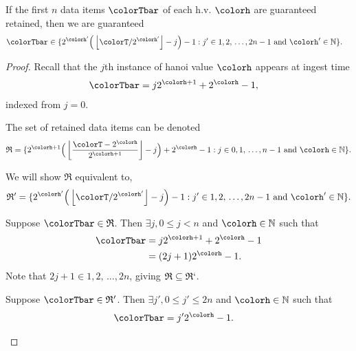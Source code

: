 \begin{lemma}
\label{thm:retained-equivalence-tilted}
If the first $n$ data items $\colorTbar$ of each h.v. $\colorh$ are guaranteed retained, then we are guaranteed
\begin{align*}
\colorTbar
&\in
\{
  2^{\colorh'}\Big(\left\lfloor \colorT / 2^{\colorh'} \right\rfloor - j\Big) - 1
  :
  j' \in 1,2,\,\ldots,2n-1
  \text{ and }
  \colorh' \in \mathbb{N}
\}.
\end{align*}
\end{lemma}
\begin{proof}

Recall that the $j$th instance of hanoi value $\colorh$ appears at ingest time
\begin{align*}
\colorTbar
&= j2^{\colorh + 1} + 2^{\colorh} - 1,
\end{align*}
indexed from $j=0$.

The set of retained data items can be denoted
\begin{align*}
\mathfrak{R} =
\{
  2^{\colorh + 1}\Big( \left\lfloor\frac{\colorT - 2^{\colorh}}{2^{\colorh + 1}} \right\rfloor - j\Big) + 2^{\colorh} - 1
  :
  j \in 0,1,\,\ldots,n-1
  \text{ and }
  \colorh \in \mathbb{N}
\}.
\end{align*}

We will show $\mathfrak{R}$ equivalent to,
\begin{align*}
\mathfrak{R}' =
\{
  2^{\colorh'}\Big(\left\lfloor \colorT / 2^{\colorh'} \right\rfloor - j\Big) - 1
  :
  j' \in 1,2,\,\ldots,2n-1
  \text{ and }
  \colorh' \in \mathbb{N}
\}.
\end{align*}

\begin{proofpart}
Suppose $\colorTbar \in \mathfrak{R}$.
Then $\exists j,  0 \leq j < n$ and $\colorh \in \mathbb{N}$ such that
\begin{align*}
\colorTbar
&= j2^{\colorh + 1} + 2^{\colorh} - 1\\
&= (2j + 1)2^{\colorh} - 1.
\end{align*}
Note that $2j + 1 \in 1,2,\,\ldots,2n$, giving $\mathfrak{R} \subseteq \mathfrak{R}`$.
\end{proofpart}

\begin{proofpart}
Suppose $\colorTbar \in \mathfrak{R}'$.
Then $\exists j',  0 \leq j' \leq 2n$ and $\colorh \in \mathbb{N}$ such that
\begin{align*}
\colorTbar
&= j'2^{\colorh} - 1.
\end{align*}


\end{proofpart}
\end{proof}
